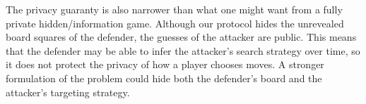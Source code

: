 The privacy guaranty is also narrower than what one might want from a fully private hidden\-/information game. Although our protocol hides the unrevealed board squares of the defender, the guesses of the attacker are public. This means that the defender may be able to infer the attacker's search strategy over time, so it does not protect the privacy of how a player chooses moves. A stronger formulation of the problem could hide both the defender's board and the attacker's targeting strategy.
